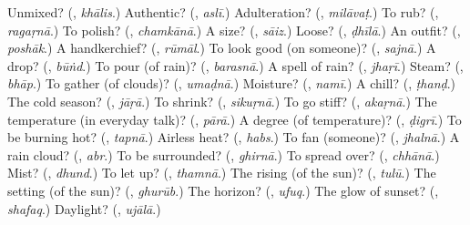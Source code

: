 \begin{tcolorbox}[breakable,colback=teal!4,colframe=teal!35!black,title={Before you move on}]
Unmixed? (\textbf{}, \emph{khālis}.) Authentic? (\textbf{}, \emph{aslī}.) Adulteration? (\textbf{}, \emph{milāvaṭ}.) To rub? (\textbf{}, \emph{ragaṛnā}.) To polish? (\textbf{}, \emph{chamkānā}.) A size? (\textbf{}, \emph{sāiz}.) Loose? (\textbf{}, \emph{ḍhīlā}.) An outfit? (\textbf{}, \emph{poshāk}.) A handkerchief? (\textbf{}, \emph{rūmāl}.) To look good (on someone)? (\textbf{}, \emph{sajnā}.) A drop? (\textbf{}, \emph{būṅd}.) To pour (of rain)? (\textbf{}, \emph{barasnā}.) A spell of rain? (\textbf{}, \emph{jhaṛī}.) Steam? (\textbf{}, \emph{bhāp}.) To gather (of clouds)? (\textbf{}, \emph{umaḍnā}.) Moisture? (\textbf{}, \emph{namī}.) A chill? (\textbf{}, \emph{ṭhanḍ}.) The cold season? (\textbf{}, \emph{jāṛā}.) To shrink? (\textbf{}, \emph{sikuṛnā}.) To go stiff? (\textbf{}, \emph{akaṛnā}.) The temperature (in everyday talk)? (\textbf{}, \emph{pārā}.) A degree (of temperature)? (\textbf{}, \emph{ḍigrī}.) To be burning hot? (\textbf{}, \emph{tapnā}.) Airless heat? (\textbf{}, \emph{habs}.) To fan (someone)? (\textbf{}, \emph{jhalnā}.) A rain cloud? (\textbf{}, \emph{abr}.) To be surrounded? (\textbf{}, \emph{ghirnā}.) To spread over? (\textbf{}, \emph{chhānā}.) Mist? (\textbf{}, \emph{dhund}.) To let up? (\textbf{}, \emph{thamnā}.) The rising (of the sun)? (\textbf{}, \emph{tulū}.) The setting (of the sun)? (\textbf{}, \emph{ghurūb}.) The horizon? (\textbf{}, \emph{ufuq}.) The glow of sunset? (\textbf{}, \emph{shafaq}.) Daylight? (\textbf{}, \emph{ujālā}.)
\end{tcolorbox}
